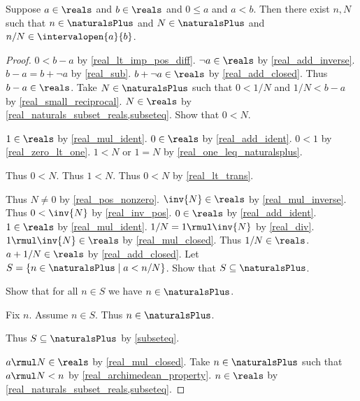 \begin{lemma}\label{real_rationals_nonneg_interval}
    Suppose $a\in\reals$ and $b\in\reals$ and $0 \leq a$ and $a < b$.
    Then there exist $n, N$ such that $n\in\naturalsPlus$ and $N\in\naturalsPlus$ and $n / N\in\intervalopen{a}{b}$.
\end{lemma}
\begin{proof}
    $0 < b - a$ by \cref{real_lt_imp_pos_diff}.
    $\neg{a}\in\reals$ by \cref{real_add_inverse}.
    $b - a = b + \neg{a}$ by \cref{real_sub}.
    $b + \neg{a}\in\reals$ by \cref{real_add_closed}.
    Thus $b - a\in\reals$.
    Take $N\in\naturalsPlus$ such that $0 < 1 / N$ and $1 / N < b - a$ by \cref{real_small_reciprocal}.
    $N\in\reals$ by \cref{real_naturals_subset_reals,subseteq}.
    Show that $0 < N$.
    \begin{subproof}
        $1\in\reals$ by \cref{real_mul_ident}.
        $0\in\reals$ by \cref{real_add_ident}.
        $0 < 1$ by \cref{real_zero_lt_one}.
        $1 < N$ or $1 = N$ by \cref{real_one_leq_naturalsplus}.
        \begin{byCase}
            Thus $0 < N$.
            Thus $1 < N$.
            Thus $0 < N$ by \cref{real_lt_trans}.
        \end{byCase}
    \end{subproof}
    Thus $N\neq 0$ by \cref{real_pos_nonzero}.
    $\inv{N}\in\reals$ by \cref{real_mul_inverse}.
    Thus $0 < \inv{N}$ by \cref{real_inv_pos}.
    $0\in\reals$ by \cref{real_add_ident}.
    $1\in\reals$ by \cref{real_mul_ident}.
    $1 / N = 1 \rmul \inv{N}$ by \cref{real_div}.
    $1 \rmul \inv{N}\in\reals$ by \cref{real_mul_closed}.
    Thus $1 / N\in\reals$.
    $a + 1 / N\in\reals$ by \cref{real_add_closed}.
    Let $S = \{ n\in\naturalsPlus \mid a < n / N\}$.
    Show that $S\subseteq\naturalsPlus$.
    \begin{subproof}
        Show that for all $n\in S$ we have $n\in\naturalsPlus$.
        \begin{subproof}
            Fix $n$.
            Assume $n\in S$.
            Thus $n\in\naturalsPlus$.
        \end{subproof}
        Thus $S\subseteq\naturalsPlus$ by \cref{subseteq}.
    \end{subproof}
    $a \rmul N\in\reals$ by \cref{real_mul_closed}.
    Take $n\in\naturalsPlus$ such that $a \rmul N < n$ by \cref{real_archimedean_property}.
    $n\in\reals$ by \cref{real_naturals_subset_reals,subseteq}.

\end{proof}
